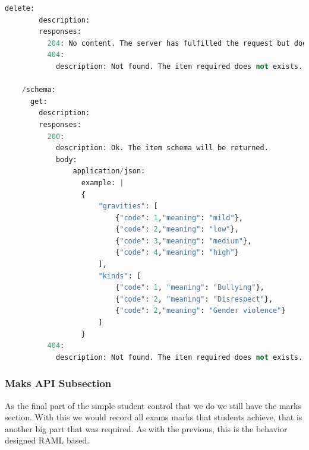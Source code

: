 \begin{lstlisting}[language=python,frame=none]
      delete:
        description:
        responses:
          204: No content. The server has fulfilled the request but does not need to return an entity-body.
          404:
            description: Not found. The item required does not exists.

    /schema:
      get:
        description:
        responses:
          200:
            description: Ok. The item schema will be returned.
            body:
                application/json:
                  example: |
                  {
                      "gravities": [
                          {"code": 1,"meaning": "mild"},
                          {"code": 2,"meaning": "low"},
                          {"code": 3,"meaning": "medium"},
                          {"code": 4,"meaning": "high"}
                      ],
                      "kinds": [
                          {"code": 1, "meaning": "Bullying"},
                          {"code": 2, "meaning": "Disrespect"},
                          {"code": 2,"meaning": "Gender violence"}
                      ]
                  }
          404:
            description: Not found. The item required does not exists.

\end{lstlisting}

\subsubsection{Maks API Subsection}

As the final part of the simple student control that we do we still have the marks
section.  With this we would record all exams marks that students achieve, that
is another big part that was required. As with the previous, this is the
behavior designed RAML based.

